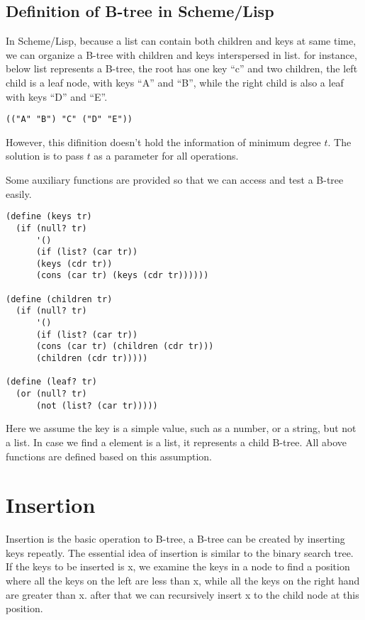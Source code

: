 \documentclass{article}
\begin{document}
\subsection*{Definition of B-tree in Scheme/Lisp}
In Scheme/Lisp, because a list can contain both children and keys at
same time, we can organize a B-tree with children and keys interspersed
in list. for instance, below list represents a B-tree, the root has one
key ``c'' and two children, the left child is a leaf node, with keys ``A''
and ``B'', while the right child is also a leaf with keys ``D'' and ``E''.

\lstset{language=lisp}
\begin{lstlisting}
(("A" "B") "C" ("D" "E"))
\end{lstlisting}

However, this difinition doesn't hold the information of minimum degree $t$.
The solution is to pass $t$ as a parameter for all operations.

Some auxiliary functions are provided so that we can access and test a 
B-tree easily.

\begin{lstlisting}
(define (keys tr)
  (if (null? tr) 
      '()
      (if (list? (car tr))
	  (keys (cdr tr))
	  (cons (car tr) (keys (cdr tr))))))

(define (children tr)
  (if (null? tr)
      '()
      (if (list? (car tr))
	  (cons (car tr) (children (cdr tr)))
	  (children (cdr tr)))))

(define (leaf? tr)
  (or (null? tr)
      (not (list? (car tr)))))
\end{lstlisting}

Here we assume the key is a simple value, such as a number, or a string, 
but not a list. In case we find a element is a list, it represents a
child B-tree. All above functions are defined based on this assumption. 

\section{Insertion}
\label{btree-insertion}
Insertion is the basic operation to B-tree, a B-tree can be created by inserting
keys repeatly. The essential idea of insertion is similar to the binary
search tree. If the keys to be inserted is x, we examine the keys in a 
node to find a position where all the keys on the left are less than x,
while all the keys on the right hand are greater than x. after that
we can recursively insert x to the child node at this position.
\end{document}
